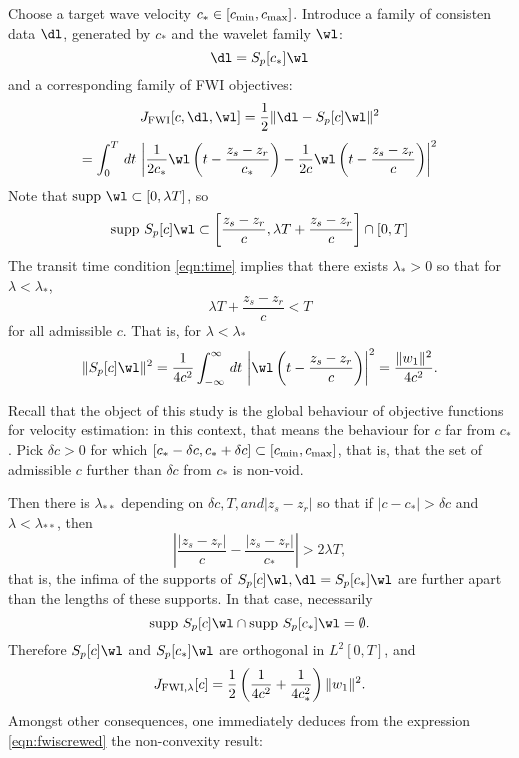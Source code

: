 Choose a target wave velocity $c_* \in [c_{\rm min},c_{\rm
  max}]$. Introduce a family of consisten data $\dl$, generated by
$c_*$ and the wavelet family $\wl$:
\begin{equation}
  \label{eqn:dfam}
  \dl = S_p[c_*]\wl
\end{equation}
and a corresponding family of FWI objectives:
\[
  J_{\rm FWI}[c,\dl,\wl] = \frac{1}{2}\|\dl-S_p[c]\wl\|^2
\]
\begin{equation}
  \label{eqn:fwiexpl}
  =
  \int_0^T\,dt\,\left|\frac{1}{2c_*}\wl\left(t-\frac{z_s-z_r}{c_*}\right)
    - \frac{1}{2c}\wl\left(t-\frac{z_s-z_r}{c}\right)\right|^2
\end{equation}
Note that $\mbox{supp }\wl \subset [0,\lambda T]$, so
\begin{equation}
  \label{eqn:wlsupps}
  \mbox{supp }S_p[c]\wl \subset \left[\frac{z_s-z_r}{c},\lambda
    T+\frac{z_s-z_r}{c}\right] \cap [0,T]
\end{equation}
The transit time condition \ref{eqn:time} implies that there exists
$\lambda_*>0$ so that for $\lambda < \lambda_*$,
\[
  \lambda T+\frac{z_s-z_r}{c} < T
\]
for all admissible $c$. That is, 
for $\lambda <\lambda_*$
\begin{equation}
  \label{eqn:constnorm}
  \|S_p[c]\wl\|^2 = \frac{1}{4c^2}\int_{-\infty}^{\infty}\,dt\,\left|
    \wl\left(t-\frac{z_s-z_r}{c}\right)\right|^2 =
  \frac{\|w_1\|^2}{4c^2}.
\end{equation}

Recall that the object of this study is the global behaviour of
objective functions for velocity estimation: in this context, that
means the behaviour for $c$ far from $c_*$.  Pick $\delta c >0$ for
which $[c_*-\delta c, c_* + \delta c] \subset [c_{\rm min},c_{\rm
  max}]$, that is, that the set of admissible $c$ further than $\delta
c$ from $c_*$ is non-void.

Then there is $\lambda_{**}$ depending on $\delta c, T, and
|z_s-z_r|$ so that if $|c-c_*|>\delta c$ and $\lambda<\lambda_{**}$, then
\[
  \left|\frac{|z_s-z_r|}{c}-\frac{|z_s-z_r|}{c_*}\right| > 2\lambda T,
\]
that is, the infima of the supports of $S_p[c]\wl, \dl=S_p[c_*]\wl$
are further apart than the lengths of these supports. In that case,
necessarily
\[
  \mbox{supp }S_p[c]\wl \cap \mbox{supp }S_p[c_*]\wl = \emptyset.
\]
Therefore $S_p[c]\wl$ and $S_p[c_*]\wl$ are orthogonal in $L^2[0,T]$,
and
\begin{equation}
  \label{eqn:fwiscrewed}
  J_{\rm FWI,\lambda}[c] =
  \frac{1}{2}\left(\frac{1}{4c^2}+\frac{1}{4c_*^2}\right)\|w_1\|^2.
\end{equation}
Amongst other consequences, one immediately deduces from the
expression \ref{eqn:fwiscrewed} the non-convexity result:

